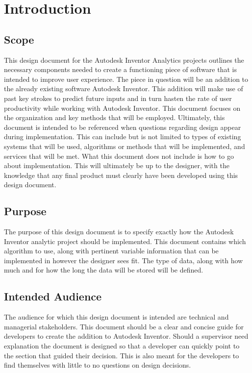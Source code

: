 \documentclass[onecolumn, draftclsnofoot,10pt, compsoc]{IEEEtran}
\begin{document}

\section{Introduction}
\subsection{Scope}
This design document for the Autodesk Inventor Analytics projects outlines the necessary components needed to create a functioning piece of software that is intended to improve user experience. The piece in question will be an addition to the already existing software Autodesk Inventor. This addition will make use of past key strokes to predict future inputs and in turn hasten the rate of user productivity while working with Autodesk Inventor. This document focuses on the organization and key methods that will be employed. Ultimately, this document is intended to be referenced when questions regarding design appear during implementation. This can include but is not limited to types of existing systems that will be used, algorithms or methods that will be implemented, and services that will be met. What this document does not include is how to go about implementation. This will ultimately be up to the designer, with the knowledge that any final product must clearly have been developed using this design document. 
\subsection{Purpose}
The purpose of this design document is to specify exactly how the Autodesk Inventor analytic project should be implemented. This document contains which algorithm to use, along with pertinent variable information that can be implemented in however the designer sees fit. The type of data, along with how much and for how the long the data will be stored will be defined. 
\subsection{Intended Audience}
The audience for which this design document is intended are technical and managerial stakeholders. This document should be a clear and concise guide for developers to create the addition to Autodesk Inventor. Should a supervisor need explanation the document is designed so that a developer can quickly point to the section that guided their decision. This is also meant for the developers to find themselves with little to no questions on design decisions. 
\end{document}
